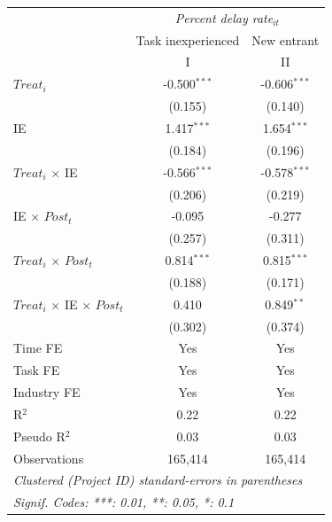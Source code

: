 \documentclass[
]{article}
\begin{document}
\begin{tabular}{lcc}
   \toprule
    & \multicolumn{2}{c}{\textit{Percent delay rate}$_{it}$}\\
                                             & Task inexperienced & New entrant \\   
   \midrule & I & II\\
   \midrule 
   $Treat_i$                                 & -0.500$^{***}$     & -0.606$^{***}$\\   
                                             & (0.155)            & (0.140)\\   
   IE                                        & 1.417$^{***}$      & 1.654$^{***}$\\   
                                             & (0.184)            & (0.196)\\   
   $Treat_i$ $\times$ IE                     & -0.566$^{***}$     & -0.578$^{***}$\\   
                                             & (0.206)            & (0.219)\\   
   IE $\times$ $Post_t$                      & -0.095             & -0.277\\   
                                             & (0.257)            & (0.311)\\   
   $Treat_i$ $\times$ $Post_t$               & 0.814$^{***}$      & 0.815$^{***}$\\   
                                             & (0.188)            & (0.171)\\   
   $Treat_i$ $\times$ IE $\times$ $Post_t$   & 0.410              & 0.849$^{**}$\\   
                                             & (0.302)            & (0.374)\\   
   \midrule 
   Time FE                                   & Yes                & Yes\\  
   Task FE                                   & Yes                & Yes\\  
   Industry FE                               & Yes                & Yes\\  
   R$^2$                                     & 0.22               & 0.22\\  
   Pseudo R$^2$                              & 0.03               & 0.03\\  
   Observations                              & 165,414            & 165,414\\  
   \midrule
   \multicolumn{3}{l}{\emph{Clustered (Project ID) standard-errors in parentheses}}\\
   \multicolumn{3}{l}{\emph{Signif. Codes: ***: 0.01, **: 0.05, *: 0.1}}\\
\end{tabular}
\par\endgroup
\end{document}
